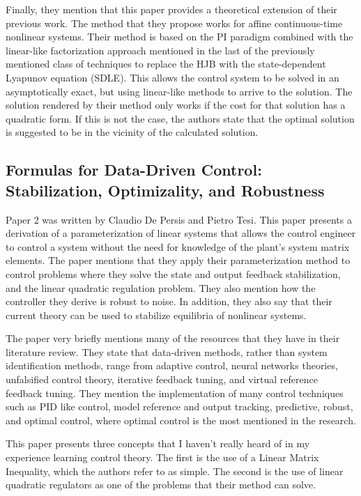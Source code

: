 \documentclass{IEEEtran}
\begin{document}
Finally, they mention that this paper provides a theoretical extension of their previous work. The method that they propose works for affine continuous-time nonlinear systems. Their method is based on the PI paradigm combined with the linear-like factorization approach mentioned in the last of the previously mentioned class of techniques to replace the HJB with the state-dependent Lyapunov equation (SDLE). This allows the control system to be solved in an asymptotically exact, but using linear-like methods to arrive to the solution. The solution rendered by their method only works if the cost for that solution has a quadratic form. If this is not the case, the authors state that the optimal solution is suggested to be in the vicinity of the calculated solution.



\subsection{Formulas for Data-Driven Control: Stabilization, Optimizality, and Robustness}

Paper 2 \cite{8933093} was written by Claudio De Persis and Pietro Tesi. This paper presents a derivation of a parameterization of linear systems that allows the control engineer to control a system without the need for knowledge of the plant's system matrix elements. The paper mentions that they apply their parameterization method to control problems where they solve the state and output feedback stabilization, and the linear quadratic regulation problem. They also mention how the controller they derive is robust to noise. In addition, they also say that their current theory can be used to stabilize equilibria of nonlinear systems.

The paper very briefly mentions many of the resources that they have in their literature review. They state that data-driven methods, rather than system identification methods, range from adaptive control, neural networks theories, unfalsified control theory, iterative feedback tuning, and virtual reference feedback tuning. They mention the implementation of many control techniques such as PID like control, model reference and output tracking, predictive, robust, and optimal control, where optimal control is the most mentioned in the research.

This paper presents three concepts that I haven't really heard of in my experience learning control theory. The first is the use of a Linear Matrix Inequality, which the authors refer to as simple. The second is the use of linear quadratic regulators as one of the problems that their method can solve.
\end{document}
